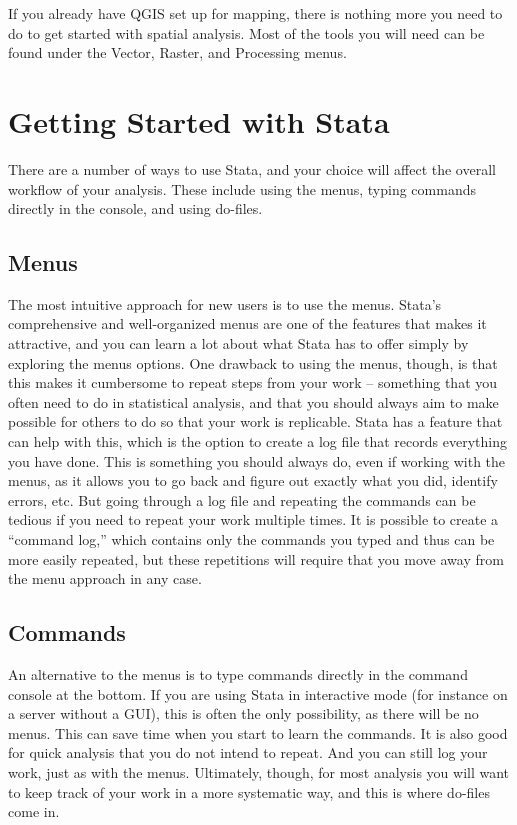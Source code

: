 \documentclass[]{book}
\begin{document}
If you already have QGIS set up for mapping, there is nothing more you need to do to get started with spatial analysis. Most of the tools you will need can be found under the Vector, Raster, and Processing menus.

\hypertarget{getting-started-with-stata}{%
\chapter{Getting Started with Stata}\label{getting-started-with-stata}}

There are a number of ways to use Stata, and your choice will affect the overall workflow of your analysis. These include using the menus, typing commands directly in the console, and using do-files.

\hypertarget{menus}{%
\section{Menus}\label{menus}}

The most intuitive approach for new users is to use the menus. Stata's comprehensive and well-organized menus are one of the features that makes it attractive, and you can learn a lot about what Stata has to offer simply by exploring the menus options. One drawback to using the menus, though, is that this makes it cumbersome to repeat steps from your work -- something that you often need to do in statistical analysis, and that you should always aim to make possible for others to do so that your work is replicable. Stata has a feature that can help with this, which is the option to create a log file that records everything you have done. This is something you should always do, even if working with the menus, as it allows you to go back and figure out exactly what you did, identify errors, etc. But going through a log file and repeating the commands can be tedious if you need to repeat your work multiple times. It is possible to create a ``command log,'' which contains only the commands you typed and thus can be more easily repeated, but these repetitions will require that you move away from the menu approach in any case.

\hypertarget{commands}{%
\section{Commands}\label{commands}}

An alternative to the menus is to type commands directly in the command console at the bottom. If you are using Stata in interactive mode (for instance on a server without a GUI), this is often the only possibility, as there will be no menus. This can save time when you start to learn the commands. It is also good for quick analysis that you do not intend to repeat. And you can still log your work, just as with the menus. Ultimately, though, for most analysis you will want to keep track of your work in a more systematic way, and this is where do-files come in.
\end{document}
